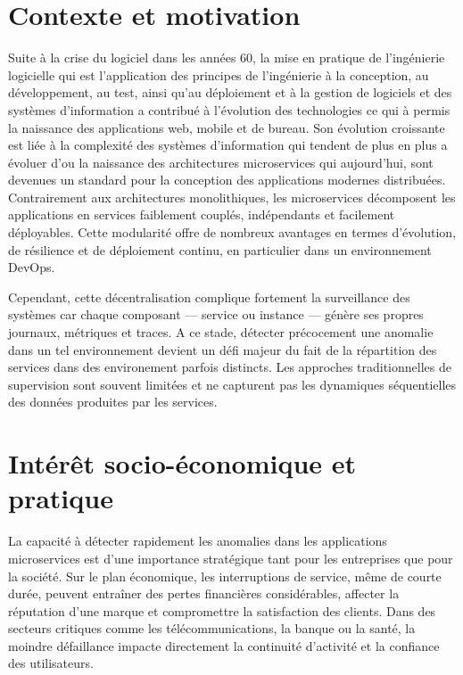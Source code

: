 \documentclass[a4paper,12pt]{report}
\begin{document}
\section{Contexte et motivation}
Suite à la crise du logiciel dans les années 60, la mise en pratique de l'ingénierie logicielle qui est l'application des principes de l'ingénierie à la conception, au développement, au test, ainsi qu’au déploiement et à la gestion de logiciels et des systèmes d’information a contribué à l'évolution des technologies ce qui à permis la naissance des applications web, mobile et de bureau. Son évolution croissante est liée à la complexité des systèmes d'information qui tendent de plus en plus a évoluer d'ou la naissance des architectures microservices qui aujourd'hui, sont devenues un standard pour la conception des applications modernes distribuées. Contrairement aux architectures monolithiques, les microservices décomposent les applications en services faiblement couplés, indépendants et facilement déployables. Cette modularité offre de nombreux avantages en termes d'évolution, de résilience et de déploiement continu, en particulier dans un environnement DevOps.

Cependant, cette décentralisation complique fortement la surveillance des systèmes car chaque composant — service ou instance — génère ses propres journaux, métriques et traces. A ce stade, détecter précocement une anomalie dans un tel environnement devient un défi majeur du fait de la répartition des services dans des environement parfois distincts. Les approches traditionnelles de supervision sont souvent limitées et ne capturent pas les dynamiques séquentielles des données produites par les services.

\section{Intérêt socio-économique et pratique}

La capacité à détecter rapidement les anomalies dans les applications microservices est d'une importance stratégique tant pour les entreprises que pour la société. Sur le plan économique, les interruptions de service, même de courte durée, peuvent entraîner des pertes financières considérables, affecter la réputation d’une marque et compromettre la satisfaction des clients. Dans des secteurs critiques comme les télécommunications, la banque ou la santé, la moindre défaillance impacte directement la continuité d’activité et la confiance des utilisateurs.
\end{document}
